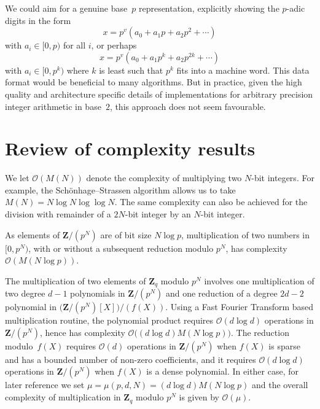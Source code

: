 \begin{rem}
We could aim for a genuine base~$p$ representation, explicitly showing 
the $p$-adic digits in the form 
\begin{equation}
x = p^v (a_0 + a_1 p + a_2 p^2 + \dotsb) 
\end{equation}
with $a_i \in [0,p)$ for all $i$, or perhaps 
\begin{equation}
x = p^v (a_0 + a_1 p^k + a_2 p^{2k} + \dotsb)
\end{equation}
with $a_i \in [0,p^k)$ where $k$ is least such that $p^{k}$ fits into 
a machine word.
This data format would be beneficial to many algorithms.  But in practice, 
given the high quality and architecture specific details of implementations 
for arbitrary precision integer arithmetic in base~$2$, this approach does 
not seem favourable.
\end{rem}

\section{Review of complexity results}

We let $\mathcal{O}(M(N))$ denote the complexity of multiplying two 
$N$-bit integers.  For example, the Sch\"onhage--Strassen algorithm 
allows us to take $M(N) = N \log N \log \log N$.  The same 
complexity can also be achieved for the division with remainder of 
a $2N$-bit integer by an $N$-bit integer.

As elements of $\mathbf{Z} / (p^N)$ are of bit size $N \log p$, 
multiplication of two numbers in $[0, p^N)$, with or without a subsequent 
reduction modulo $p^N$, has complexity $\mathcal{O}(M(N \log p))$.

The multiplication of two elements of $\mathbf{Z}_q$ modulo $p^N$ 
involves one multiplication of two degree $d-1$ polynomials in 
$\mathbf{Z}/(p^N)$ and one reduction of a degree $2d - 2$ polynomial 
in $\bigl( \mathbf{Z}/(p^N)[X] \bigr) / (f(X))$.   Using a Fast Fourier 
Transform based multiplication routine, the polynomial product requires 
$\mathcal{O}(d \log d)$ operations in $\mathbf{Z}/(p^N)$, hence has 
complexity $\mathcal{O}\bigl((d \log d) M(N \log p)\bigr)$.  The reduction 
modulo~$f(X)$ requires $\mathcal{O}(d)$ operations in $\mathbf{Z}/(p^N)$ 
when $f(X)$ is sparse and has a bounded number of non-zero coefficients, 
and it requires $\mathcal{O}(d \log d)$ operations in $\mathbf{Z}/(p^N)$ when 
$f(X)$ is a dense polynomial.  In either case, for later reference we set 
$\mu = \mu(p,d,N) = (d \log d) M(N \log p)$ and the overall complexity of 
multiplication in $\mathbf{Z}_q$ modulo $p^N$ is given by 
$\mathcal{O}(\mu)$.

